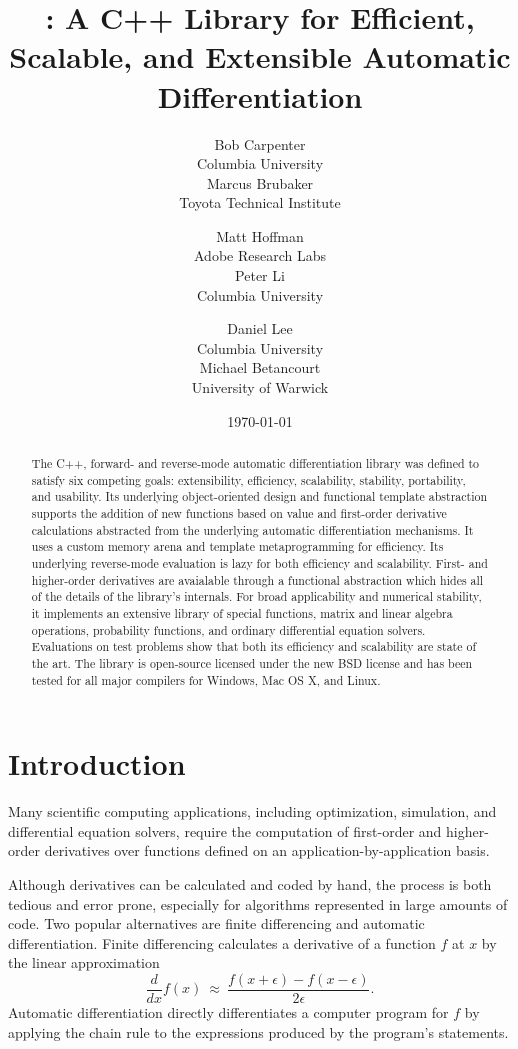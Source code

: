 \documentclass[10pt]{article}
\title{\Large\bfseries \code{\bfseries agrad}: A C++ Library for Efficient, Scalable,
  and Extensible Automatic Differentiation}
\author{\large Bob Carpenter \\ {\small Columbia University}
        \\[8pt]
        \large Marcus Brubaker \\ {\small Toyota Technical Institute}
   \and \large Matt Hoffman \\ {\small Adobe Research Labs}
        \\[8pt]
        \large Peter Li \\ {\small Columbia University}
   \and \large Daniel Lee \\ {\small Columbia University}
        \\[8pt]
        \large Michael Betancourt \\ {\small University of Warwick}
}
\date{\vspace*{8pt}\normalsize \today}
\begin{document}
\maketitle

\begin{abstract} 
  \noindent
  The  C++, forward- and reverse-mode automatic
  differentiation library was defined to satisfy
  six competing goals: extensibility, efficiency, scalability,
  stability, portability, and usability. Its underlying
  object-oriented design
  and functional template abstraction supports the addition of new
  functions based on value and first-order derivative calculations
  abstracted from the underlying automatic differentiation mechanisms.
  It uses a custom memory arena and template metaprogramming for
  efficiency.  Its underlying reverse-mode 
  evaluation is lazy for both efficiency and scalability.
  First- and higher-order derivatives are avaialable through a
  functional abstraction which hides all of the details of the
  library's internals. For broad applicability and numerical
  stability, it implements an extensive library of special functions,
  matrix and linear algebra operations, probability functions, 
  and ordinary differential equation solvers.  Evaluations on test
  problems show that both its efficiency and scalability are state of
  the art.  The  library is open-source licensed under the
  new BSD license and has been tested for all major compilers for
  Windows, Mac OS X, and Linux. 
\end{abstract}


\section{Introduction}

Many scientific computing applications, including optimization,
simulation, and differential equation solvers, require the computation
of first-order and higher-order derivatives over functions defined on
an application-by-application basis.  

Although derivatives can be calculated and coded by hand, the process
is both tedious and error prone, especially for algorithms represented
in large amounts of code. Two popular alternatives are finite
differencing and automatic differentiation. Finite differencing calculates a
derivative of a function $f$ at $x$ by the linear approximation
\[ 
\frac{d}{dx}f(x) 
\ \approx \
\frac{f(x + \epsilon) - f(x - \epsilon)}{2\epsilon}.
\]
Automatic differentiation directly differentiates a computer program
for $f$ by applying the chain rule to the expressions produced by the
program's statements.
\end{document}
